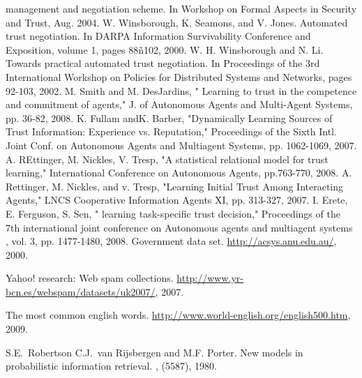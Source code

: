 \documentclass{llncs}
\begin{document}
\begin{thebibliography}{99.}
management and negotiation scheme. In Workshop on 
Formal Aspects in Security and Trust, Aug. 2004.
 W. Winsborough, K. Seamons, and V. Jones. Automated
trust negotiation. In DARPA Information Survivability Conference
and Exposition, volume 1, pages 88ñ102, 2000.
 W. H. Winsborough and N. Li. Towards practical automated
trust negotiation. In Proceedings of the 3rd International
Workshop on Policies for Distributed Systems and
Networks, pages 92-103, 2002.
 M. Smith and M. DesJardins, " Learning to trust in the competence and commitment of agents," J. of 	Autonomous Agents and Multi-Agent Systems, pp. 36-82, 2008. 
 K. Fullam andK. Barber, "Dynamically Learning Sources of Trust Information: Experience vs. Reputation," Proceedings of the Sixth Intl. Joint Conf. on Autonomous Agents and Multiagent Systems, pp. 1062-1069, 2007.
 A. REttinger, M. Nickles, V. Tresp, "A statistical relational model for trust learning," International Conference on Autonomous Agents,  pp.763-770, 2008. 
 A. Rettinger, M. Nickles, and v. Tresp,  "Learning Initial Trust Among Interacting Agents," LNCS Cooperative Information Agents XI, pp. 313-327, 2007.
 I. Erete, E. Ferguson, S. Sen, " learning task-specific trust decision," Proceedings of the 7th international joint conference on Autonomous agents and multiagent systems , vol. 3,  pp. 1477-1480, 2008.
Government data set.
\newblock \url{http://acsys.anu.edu.au/}, 2000.

Yahoo! research: Web spam collections.
\newblock \url{http://www.yr-bcn.es/webspam/datasets/uk2007/}, 2007.

The most common english words.
\newblock \url{http://www.world-english.org/english500.htm}, 2009.

S.E.~Robertson C.J.~van Rijsbergen and M.F. Porter.
\newblock New models in probabilistic information retrieval.
, (5587), 1980.
\end{thebibliography}

\end{document}
